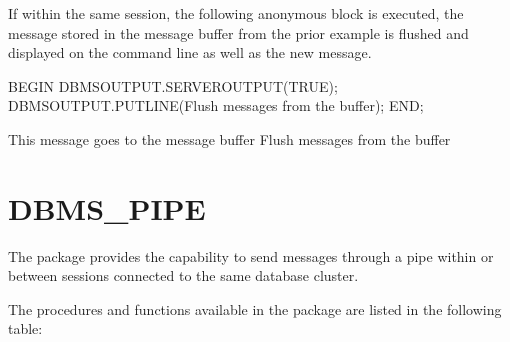 \documentclass[letterpaper,10pt,english,openany,oneside]{sphinxmanual}
\begin{document}
If within the same session, the following anonymous block is executed, the message stored in the message buffer from the prior example is flushed and displayed on the command line as well as the new message.

%
\begin{sphinxVerbatim}[commandchars=\\\{\}]
BEGIN
    DBMS\PYGZus{}OUTPUT.SERVEROUTPUT(TRUE);
    DBMS\PYGZus{}OUTPUT.PUT\PYGZus{}LINE(\PYGZsq{}Flush messages from the buffer\PYGZsq{});
END;

This message goes to the message buffer
Flush messages from the buffer
\end{sphinxVerbatim}

\newpage


\section{DBMS\_PIPE}
\label{\detokenize{dbms_pipe::doc}}\label{\detokenize{dbms_pipe:dbms-pipe}}
The  package provides the capability to send messages through
a pipe within or between sessions connected to the same database
cluster.

The procedures and functions available in the  package are
listed in the following table:
\end{document}
